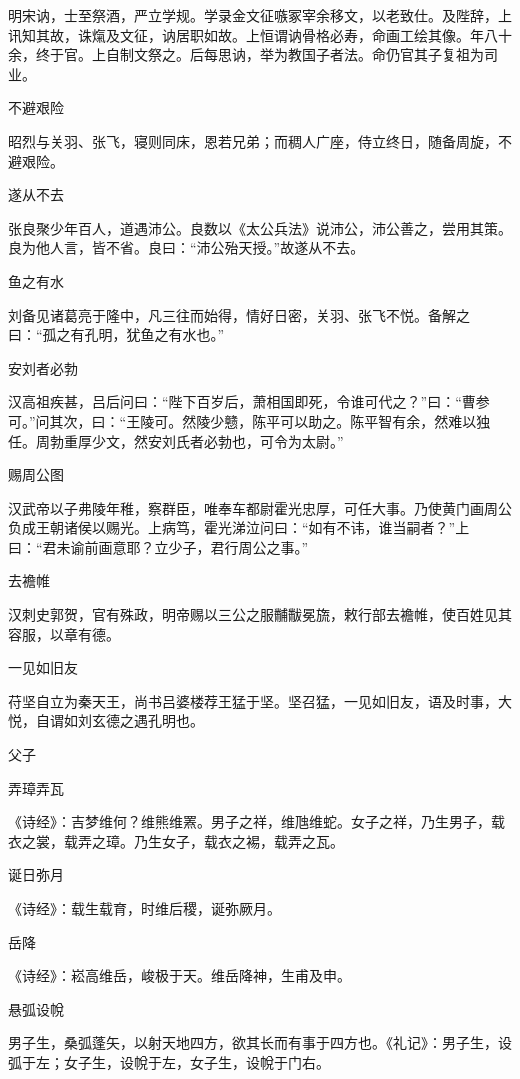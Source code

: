 \documentclass[a4paper,12pt,UTF8,twoside]{ctexbook}
\begin{document}
    明宋讷，士至祭酒，严立学规。学录金文征嗾冢宰余移文，以老致仕。及陛辞，上讯知其故，诛熂及文征，讷居职如故。上恒谓讷骨格必寿，命画工绘其像。年八十余，终于官。上自制文祭之。后每思讷，举为教国子者法。命仍官其子复祖为司业。
    
    不避艰险
    
    昭烈与关羽、张飞，寝则同床，恩若兄弟；而稠人广座，侍立终日，随备周旋，不避艰险。
    
    遂从不去
    
    张良聚少年百人，道遇沛公。良数以《太公兵法》说沛公，沛公善之，尝用其策。良为他人言，皆不省。良曰：“沛公殆天授。”故遂从不去。
    
    鱼之有水
    
    刘备见诸葛亮于隆中，凡三往而始得，情好日密，关羽、张飞不悦。备解之曰：“孤之有孔明，犹鱼之有水也。”
    
    安刘者必勃
    
    汉高祖疾甚，吕后问曰：“陛下百岁后，萧相国即死，令谁可代之？”曰：“曹参可。”问其次，曰：“王陵可。然陵少戆，陈平可以助之。陈平智有余，然难以独任。周勃重厚少文，然安刘氏者必勃也，可令为太尉。”
    
    赐周公图
    
    汉武帝以子弗陵年稚，察群臣，唯奉车都尉霍光忠厚，可任大事。乃使黄门画周公负成王朝诸侯以赐光。上病笃，霍光涕泣问曰：“如有不讳，谁当嗣者？”上曰：“君未谕前画意耶？立少子，君行周公之事。”
    
    去襜帷
    
    汉刺史郭贺，官有殊政，明帝赐以三公之服黼黻冕旒，敕行部去襜帷，使百姓见其容服，以章有德。
    
    一见如旧友
    
    苻坚自立为秦天王，尚书吕婆楼荐王猛于坚。坚召猛，一见如旧友，语及时事，大悦，自谓如刘玄德之遇孔明也。
    
    父子
    
    弄璋弄瓦
    
    《诗经》：吉梦维何？维熊维罴。男子之祥，维虺维蛇。女子之祥，乃生男子，载衣之裳，载弄之璋。乃生女子，载衣之裼，载弄之瓦。
    
    诞日弥月
    
    《诗经》：载生载育，时维后稷，诞弥厥月。
    
    岳降
    
    《诗经》：崧高维岳，峻极于天。维岳降神，生甫及申。
    
    悬弧设帨
    
    男子生，桑弧蓬矢，以射天地四方，欲其长而有事于四方也。《礼记》：男子生，设弧于左；女子生，设帨于左，女子生，设帨于门右。
    
\end{document}

